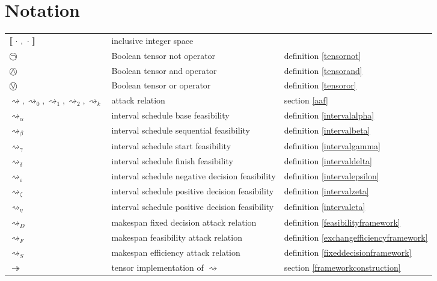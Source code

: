 \chapter{Notation}

\vspace{-2.5\baselineskip}

\begin{tabular}{l l l}
	$\intset{\ \cdot\ ,\ \cdot\ }$ & inclusive integer space & \\
	$\incircbin{\neg}$ & Boolean tensor not operator & definition \ref{tensornot} \\
	$\incircbin{\land}$ & Boolean tensor and operator & definition \ref{tensorand} \\
	$\incircbin{\lor}$ & Boolean tensor or operator & definition \ref{tensoror} \\
	$\rightsquigarrow,\rightsquigarrow_0,\rightsquigarrow_1,\rightsquigarrow_2,\rightsquigarrow_k$ & attack relation & section \ref{aaf}\\
	$\rightsquigarrow_\alpha$ & interval schedule base feasibility & definition \ref{intervalalpha} \\
	$\rightsquigarrow_\beta$ & interval schedule sequential feasibility & definition \ref{intervalbeta} \\
	$\rightsquigarrow_\gamma$ & interval schedule start feasibility & definition \ref{intervalgamma} \\
	$\rightsquigarrow_\delta$ & interval schedule finish feasibility & definition \ref{intervaldelta} \\
	$\rightsquigarrow_\varepsilon$ & interval schedule negative decision feasibility & definition \ref{intervalepsilon} \\
	$\rightsquigarrow_\zeta$ & interval schedule positive decision feasibility & definition \ref{intervalzeta} \\
	$\rightsquigarrow_\eta$ & interval schedule positive decision feasibility & definition \ref{intervaleta} \\
	$\rightsquigarrow_D$ & makespan fixed decision attack relation & definition \ref{feasibilityframework} \\
	$\rightsquigarrow_F$ & makespan feasibility attack relation & definition \ref{exchangefficiencyframework} \\
	$\rightsquigarrow_S$ & makespan efficiency attack relation & definition \ref{fixeddecisionframework} \\
	$\twoheadrightarrow$ & tensor implementation of $\rightsquigarrow$ & section \ref{frameworkconstruction} \\

\end{tabular}
